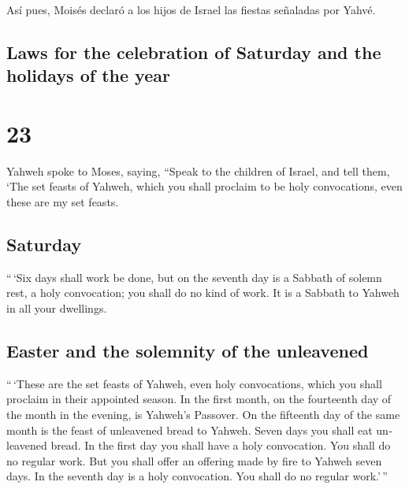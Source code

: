 \begin{paracol}{2}
 Así pues, Moisés declaró a los hijos de Israel las
fiestas señaladas por Yahvé.

\switchcolumn
\begin{otherlanguage}{english}

\hypertarget{laws-for-the-celebration-of-saturday-and-the-holidays-of-the-year}{%
\subsection{Laws for the celebration of Saturday and the holidays of the
year}\label{laws-for-the-celebration-of-saturday-and-the-holidays-of-the-year}}

\hypertarget{section-45}{%
\section{23}\label{section-45}}

 Yahweh spoke to Moses, saying,  ``Speak to
the children of Israel, and tell them, `The set feasts of Yahweh, which
you shall proclaim to be holy convocations, even these are my set
feasts.

\hypertarget{saturday}{%
\subsection{Saturday}\label{saturday}}

 ``\,`Six days shall work be done, but on the seventh day
is a Sabbath of solemn rest, a holy convocation; you shall do no kind of
work. It is a Sabbath to Yahweh in all your dwellings.

\hypertarget{easter-and-the-solemnity-of-the-unleavened}{%
\subsection{Easter and the solemnity of the
unleavened}\label{easter-and-the-solemnity-of-the-unleavened}}

 ``\,`These are the set feasts of Yahweh, even holy
convocations, which you shall proclaim in their appointed season.
 In the first month, on the fourteenth day of the month in
the evening, is Yahweh's Passover.  On the fifteenth day
of the same month is the feast of unleavened bread to Yahweh. Seven days
you shall eat unleavened bread.  In the first day you
shall have a holy convocation. You shall do no regular work.
 But you shall offer an offering made by fire to Yahweh
seven days. In the seventh day is a holy convocation. You shall do no
regular work.'\,''


\end{otherlanguage}
\end{paracol}
